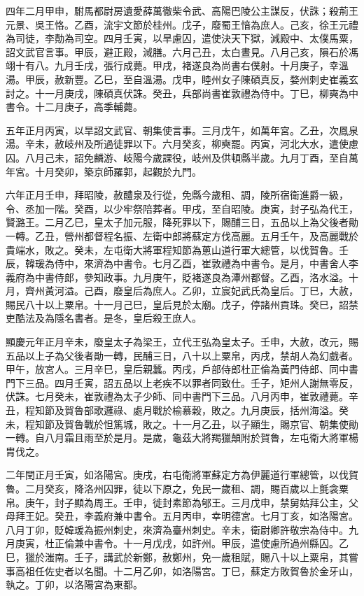 \begin{pinyinscope}
 四年二月甲申，駙馬都尉房遺愛薛萬徹柴令武、高陽巴陵公主謀反，伏誅；殺荊王元景、吳王恪。乙酉，流宇文節於桂州。戊子，廢蜀王愔為庶人。己亥，徐王元禮為司徒，李勣為司空。四月壬寅，以旱慮囚，遣使決天下獄，減殿中、太僕馬粟，詔文武官言事。甲辰，避正殿，減膳。六月己丑，太白晝見。八月己亥，隕石於馮翊十有八。九月壬戌，張行成薨。甲戌，褚遂良為尚書右僕射。十月庚子，幸溫湯。甲辰，赦新豐。乙巳，至自溫湯。戊申，睦州女子陳碩真反，婺州刺史崔義玄討之。十一月庚戌，陳碩真伏誅。癸丑，兵部尚書崔敦禮為侍中。丁巳，柳奭為中書令。十二月庚子，高季輔薨。



 五年正月丙寅，以旱詔文武官、朝集使言事。三月戊午，如萬年宮。乙丑，次鳳泉湯。辛未，赦岐州及所過徒罪以下。六月癸亥，柳奭罷。丙寅，河北大水，遣使慮囚。八月己未，詔免麟游、岐陽今歲課役，岐州及供頓縣半歲。九月丁酉，至自萬年宮。十月癸卯，築京師羅郭，起觀於九門。



 六年正月壬申，拜昭陵，赦醴泉及行從，免縣今歲租、調，陵所宿衛進爵一級，令、丞加一階。癸酉，以少牢祭陪葬者。甲戌，至自昭陵。庚寅，封子弘為代王，賢潞王。二月乙巳，皇太子加元服，降死罪以下，賜酺三日，五品以上為父後者勛一轉。乙丑，營州都督程名振、左衛中郎將蘇定方伐高麗。五月壬午，及高麗戰於貴端水，敗之。癸未，左屯衛大將軍程知節為蔥山道行軍大總管，以伐賀魯。壬辰，韓瑗為侍中，來濟為中書令。七月乙酉，崔敦禮為中書令。是月，中書舍人李義府為中書侍郎，參知政事。九月庚午，貶褚遂良為潭州都督。乙酉，洛水溢。十月，齊州黃河溢。己酉，廢皇后為庶人。乙卯，立宸妃武氏為皇后。丁巳，大赦，賜民八十以上粟帛。十一月己巳，皇后見於太廟。戊子，停諸州貢珠。癸巳，詔禁吏酷法及為隱名書者。是冬，皇后殺王庶人。



 顯慶元年正月辛未，廢皇太子為梁王，立代王弘為皇太子。壬申，大赦，改元，賜五品以上子為父後者勛一轉，民酺三日，八十以上粟帛，丙戌，禁胡人為幻戲者。甲午，放宮人。三月辛巳，皇后親蠶。丙戌，戶部侍郎杜正倫為黃門侍郎、同中書門下三品。四月壬寅，詔五品以上老疾不以罪者同致仕。壬子，矩州人謝無零反，伏誅。七月癸未，崔敦禮為太子少師、同中書門下三品。八月丙申，崔敦禮薨。辛丑，程知節及賀魯部歌邏祿、處月戰於榆慕穀，敗之。九月庚辰，括州海溢。癸未，程知節及賀魯戰於怛篤城，敗之。十一月乙丑，以子顯生，賜京官、朝集使勛一轉。自八月霜且雨至於是月。是歲，龜茲大將羯獵顛附於賀魯，左屯衛大將軍楊胄伐之。



 二年閏正月壬寅，如洛陽宮。庚戌，右屯衛將軍蘇定方為伊麗道行軍總管，以伐賀魯。二月癸亥，降洛州囚罪，徒以下原之，免民一歲租、調，賜百歲以上氈衾粟帛。庚午，封子顯為周王。壬申，徙封素節為郇王。三月戊申，禁舅姑拜公主，父母拜王妃。癸丑，李義府兼中書令。五月丙申，幸明德宮。七月丁亥，如洛陽宮。八月丁卯，貶韓瑗為振州刺史，來濟為臺州刺史。辛未，衛尉卿許敬宗為侍中。九月庚寅，杜正倫兼中書令。十一月戊戌，如許州。甲辰，遣使慮所過州縣囚。乙巳，獵於滍南。壬子，講武於新鄭，赦鄭州，免一歲租賦，賜八十以上粟帛，其嘗事高祖任佐史者以名聞。十二月乙卯，如洛陽宮。丁巳，蘇定方敗賀魯於金牙山，執之。丁卯，以洛陽宮為東都。




\end{pinyinscope}
